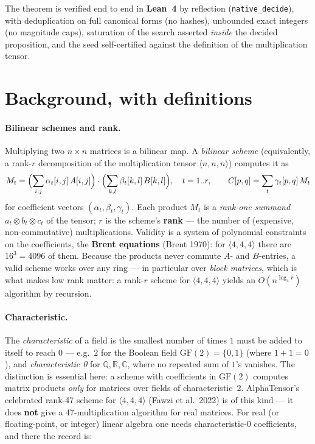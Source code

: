\documentclass[10pt]{article}
\begin{document}
The theorem is verified end to end in \textbf{Lean~4} by reflection
(\texttt{native\_decide}), with deduplication on full canonical forms
(no hashes), unbounded exact integers (no magnitude caps), saturation
of the search asserted \emph{inside} the decided proposition, and the
seed self-certified against the definition of the multiplication
tensor.

\section{Background, with definitions}\label{sec:background}

\paragraph{Bilinear schemes and rank.}
Multiplying two $n\times n$ matrices is a bilinear map. A
\emph{bilinear scheme} (equivalently, a rank-$r$ decomposition of the
multiplication tensor $\langle n,n,n\rangle$) computes it as
\[
  M_t=\Bigl(\sum_{i,j}\alpha_t[i,j]\,A[i,j]\Bigr)\cdot
      \Bigl(\sum_{k,l}\beta_t[k,l]\,B[k,l]\Bigr),\quad t=1..r,\qquad
  C[p,q]=\sum_t \gamma_t[p,q]\,M_t
\]
for coefficient vectors $(\alpha_t,\beta_t,\gamma_t)$. Each product
$M_t$ is a \emph{rank-one summand} $a_t\otimes b_t\otimes c_t$ of the
tensor; $r$ is the scheme's \textbf{rank} --- the number of
(expensive, non-commutative) multiplications. Validity is a system of
polynomial constraints on the coefficients, the \textbf{Brent
equations} (Brent 1970): for $\langle 4,4,4\rangle$ there are
$16^3=4096$ of them. Because the products never commute $A$- and
$B$-entries, a valid scheme works over any ring --- in particular over
\emph{block matrices}, which is what makes low rank matter: a rank-$r$
scheme for $\langle4,4,4\rangle$ yields an $O(n^{\log_4 r})$ algorithm
by recursion.

\paragraph{Characteristic.}
The \emph{characteristic} of a field is the smallest number of times
$1$ must be added to itself to reach $0$ --- e.g.\ $2$ for the Boolean
field $\mathrm{GF}(2)=\{0,1\}$ (where $1+1=0$), and
\emph{characteristic 0} for $\mathbb{Q},\mathbb{R},\mathbb{C}$, where
no repeated sum of $1$'s vanishes. The distinction is essential here:
a scheme with coefficients in $\mathrm{GF}(2)$ computes matrix
products \emph{only} for matrices over fields of characteristic~2.
AlphaTensor's celebrated rank-47 scheme for $\langle4,4,4\rangle$
(Fawzi et al.\ 2022) is of this kind --- it does \textbf{not} give a
47-multiplication algorithm for real matrices. For real (or
floating-point, or integer) linear algebra one needs
characteristic-0 coefficients, and there the record is:
\end{document}
